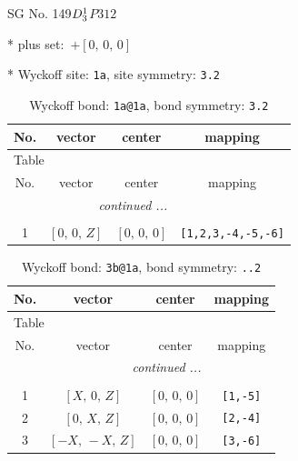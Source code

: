\documentclass[fleqn,8pt]{jsarticle}
\begin{document}
\setcounter{MaxMatrixCols}{32}

\renewcommand{\tablename}{Table~}
\renewcommand{\figurename}{Figure~}
\begin{center}
\LARGE
SG No. 149\quad$D_{\rm 3}^{1}$\quad$P312$\quad[ trigonal ]
\end{center}

* plus set:\,\,\,$+\left[ 0,\, 0,\, 0 \right]$


* Wyckoff site: {\tt 1a}, site symmetry: {\tt 3.2}
\renewcommand{\arraystretch}{1.2}
\begin{longtable}{cccc}
\caption{Wyckoff bond: {\tt 1a@1a}, bond symmetry: {\tt 3.2}}
 \\
 \hline \hline
No. & vector & center & mapping \\ \hline \endfirsthead

\multicolumn{3}{l}{\tablename\ \thetable{}} \\
 \hline \hline
No. & vector & center & mapping \\ \hline \endhead

 \hline \hline
\multicolumn{3}{r}{\footnotesize\it continued ...} \\ \endfoot

 \hline \hline
\multicolumn{3}{r}{} \\ \endlastfoot

1 & $\left[ 0,\, 0,\, Z \right]$ & $\left[ 0,\, 0,\, 0 \right]$ & {\tt [1,2,3,-4,-5,-6]} \\
\end{longtable}
\renewcommand{\arraystretch}{1.2}
\begin{longtable}{cccc}
\caption{Wyckoff bond: {\tt 3b@1a}, bond symmetry: {\tt ..2}}
 \\
 \hline \hline
No. & vector & center & mapping \\ \hline \endfirsthead

\multicolumn{3}{l}{\tablename\ \thetable{}} \\
 \hline \hline
No. & vector & center & mapping \\ \hline \endhead

 \hline \hline
\multicolumn{3}{r}{\footnotesize\it continued ...} \\ \endfoot

 \hline \hline
\multicolumn{3}{r}{} \\ \endlastfoot

1 & $\left[ X,\, 0,\, Z \right]$ & $\left[ 0,\, 0,\, 0 \right]$ & {\tt [1,-5]} \\ \hline
2 & $\left[ 0,\, X,\, Z \right]$ & $\left[ 0,\, 0,\, 0 \right]$ & {\tt [2,-4]} \\ \hline
3 & $\left[ - X,\, - X,\, Z \right]$ & $\left[ 0,\, 0,\, 0 \right]$ & {\tt [3,-6]} \\
\end{longtable}
\end{document}
